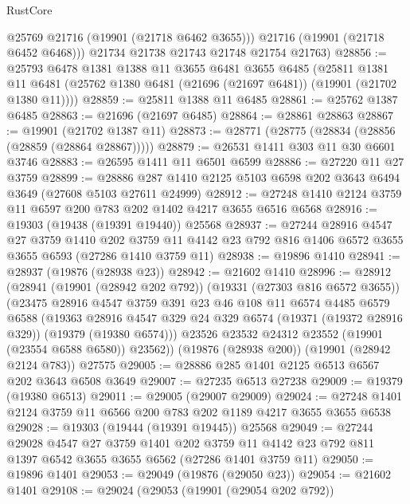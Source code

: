 \begin{lexlean}{RustCore}
\begin{coremodule}
          @25769
          @21716
          (@19901 (@21718 @6462 @3655)))
        @21716
        (@19901 (@21718 @6452 @6468)))
      @21734
      @21738
      @21743
      @21748
      @21754
      @21763)
@28856 := @25793
    @6478
    @1381
    @1388
    @11
    @3655
    @6481
    @3655
    @6485
    (@25811
      @1381
      @11
      @6481
      (@25762 @1380 @6481 (@21696 (@21697 @6481)) (@19901 (@21702 @1380 @11))))
@28859 := @25811 @1388 @11 @6485
@28861 := @25762 @1387 @6485
@28863 := @21696 (@21697 @6485)
@28864 := @28861 @28863
@28867 := @19901 (@21702 @1387 @11)
@28873 := @28771 (@28775 (@28834 (@28856 (@28859 (@28864 @28867)))))
@28879 := @26531 @1411 @303 @11 @30 @6601 @3746
@28883 := @26595 @1411 @11 @6501 @6599
@28886 := @27220 @11 @27 @3759
@28899 := @28886 @287 @1410 @2125 @5103 @6598 @202 @3643 @6494 @3649 (@27608 @5103 @27611 @24999)
@28912 := @27248 @1410 @2124 @3759 @11 @6597 @200 @783 @202 @1402 @4217 @3655 @6516 @6568
@28916 := @19303 (@19438 (@19391 @19440)) @25568
@28937 := @27244
    @28916
    @4547
    @27
    @3759
    @1410
    @202
    @3759
    @11
    @4142
    @23
    @792
    @816
    @1406
    @6572
    @3655
    @3655
    @6593
    (@27286 @1410 @3759 @11)
@28938 := @19896 @1410
@28941 := @28937 (@19876 (@28938 @23))
@28942 := @21602 @1410
@28996 := @28912
    (@28941
      (@19901 (@28942 @202 @792))
      (@19331 (@27303 @816 @6572 @3655))
      (@23475
        @28916
        @4547
        @3759
        @391
        @23
        @46
        @108
        @11
        @6574
        @4485
        @6579
        @6588
        (@19363
          @28916
          @4547
          @329
          @24
          @329
          @6574
          (@19371 (@19372 @28916 @329))
          (@19379 (@19380 @6574)))
        @23526
        @23532
        @24312
        @23552
        (@19901 (@23554 @6588 @6580))
        @23562))
    (@19876 (@28938 @200))
    (@19901 (@28942 @2124 @783))
    @27575
@29005 := @28886 @285 @1401 @2125 @6513 @6567 @202 @3643 @6508 @3649
@29007 := @27235 @6513 @27238
@29009 := @19379 (@19380 @6513)
@29011 := @29005 (@29007 @29009)
@29024 := @27248 @1401 @2124 @3759 @11 @6566 @200 @783 @202 @1189 @4217 @3655 @3655 @6538
@29028 := @19303 (@19444 (@19391 @19445)) @25568
@29049 := @27244
    @29028
    @4547
    @27
    @3759
    @1401
    @202
    @3759
    @11
    @4142
    @23
    @792
    @811
    @1397
    @6542
    @3655
    @3655
    @6562
    (@27286 @1401 @3759 @11)
@29050 := @19896 @1401
@29053 := @29049 (@19876 (@29050 @23))
@29054 := @21602 @1401
@29108 := @29024
    (@29053
      (@19901 (@29054 @202 @792))

\end{coremodule}
\end{lexlean}
